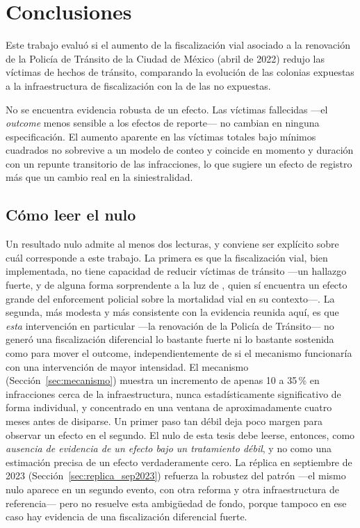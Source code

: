 \chapter{Conclusiones}
\label{chap:conclusiones}

\noindent
Este trabajo evaluó si el aumento de la fiscalización vial asociado a la
renovación de la Policía de Tránsito de la Ciudad de México (abril de 2022)
redujo las víctimas de hechos de tránsito, comparando la evolución de las
colonias expuestas a la infraestructura de fiscalización con la de las no
expuestas.

No se encuentra evidencia robusta de un efecto. Las víctimas fallecidas —el
\emph{outcome} menos sensible a los efectos de reporte— no cambian en ninguna
especificación. El aumento aparente en las víctimas totales bajo mínimos
cuadrados no sobrevive a un modelo de conteo y coincide en momento y duración
con un repunte transitorio de las infracciones, lo que sugiere un efecto de
registro más que un cambio real en la siniestralidad.

\section{Cómo leer el nulo}

Un resultado nulo admite al menos dos lecturas, y conviene ser explícito sobre
cuál corresponde a este trabajo. La primera es que la fiscalización vial, bien
implementada, no tiene capacidad de reducir víctimas de tránsito —un hallazgo
fuerte, y de alguna forma sorprendente a la luz de \citet{deangelohansen2014},
quien sí encuentra un efecto grande del enforcement policial sobre la
mortalidad vial en su contexto—. La segunda, más modesta y más consistente
con la evidencia reunida aquí, es que \emph{esta} intervención en particular
—la renovación de la Policía de Tránsito— no generó una fiscalización
diferencial lo bastante fuerte ni lo bastante sostenida como para mover el
outcome, independientemente de si el mecanismo funcionaría con una
intervención de mayor intensidad. El mecanismo (Sección~\ref{sec:mecanismo})
muestra un incremento de apenas 10 a 35\,\% en infracciones cerca de la
infraestructura, nunca estadísticamente significativo de forma individual, y
concentrado en una ventana de aproximadamente cuatro meses antes de disiparse.
Un primer paso tan débil deja poco margen para observar un efecto en el
segundo. El nulo de esta tesis debe leerse, entonces, como \emph{ausencia de
evidencia de un efecto bajo un tratamiento débil}, y no como una estimación
precisa de un efecto verdaderamente cero. La réplica en septiembre de 2023
(Sección~\ref{sec:replica_sep2023}) refuerza la robustez del patrón —el mismo
nulo aparece en un segundo evento, con otra reforma y otra infraestructura de
referencia— pero no resuelve esta ambigüedad de fondo, porque tampoco en ese
caso hay evidencia de una fiscalización diferencial fuerte.

